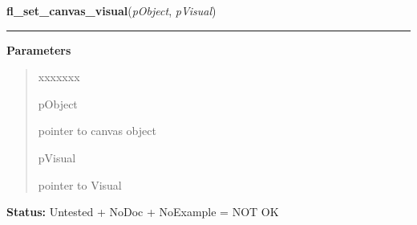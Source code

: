     \vspace{0.5ex}

\hspace{.8\funcindent}\begin{boxedminipage}{\funcwidth}

    \raggedright \textbf{fl\_set\_canvas\_visual}(\textit{pObject}, \textit{pVisual})

    \vspace{-1.5ex}

    \rule{\textwidth}{0.5\fboxrule}
\setlength{\parskip}{2ex}
\setlength{\parskip}{1ex}
      \textbf{Parameters}
      \vspace{-1ex}

      \begin{quote}
        \begin{Ventry}{xxxxxxx}

          \item[pObject]

          pointer to canvas object

          \item[pVisual]

          pointer to Visual

        \end{Ventry}

      \end{quote}

\textbf{Status:} Untested + NoDoc + NoExample = NOT OK



    \end{boxedminipage}

    \label{xformslib:library:fl_set_canvas_depth}

    \vspace{0.5ex}

